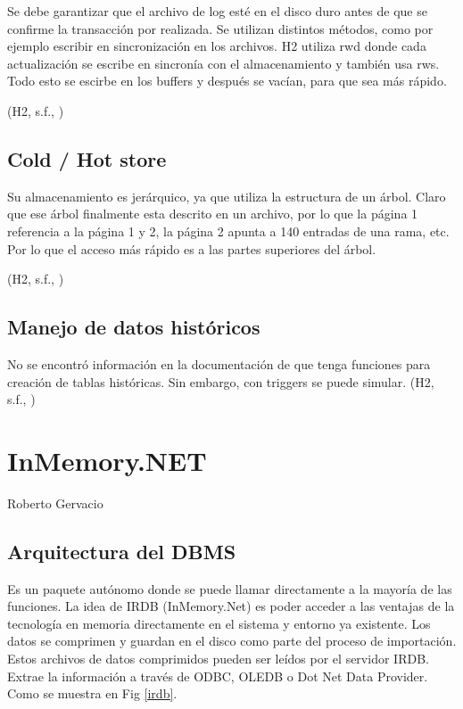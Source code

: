 \documentclass{acmart}
\begin{document}
Se debe garantizar que el archivo de log esté en el disco duro antes de que se confirme la transacción por realizada. Se utilizan distintos métodos, como por ejemplo escribir en sincronización en los archivos. H2 utiliza rwd donde cada actualización se escribe en sincronía con el almacenamiento y también usa rws. Todo esto se escirbe en los buffers y después se vacían, para que sea más rápido. 

(H2, s.f., \cite{h2advanced})

\subsection{Cold / Hot store}

Su almacenamiento es jerárquico, ya que utiliza la estructura de un árbol. Claro que ese árbol finalmente esta descrito en un archivo, por lo que la página 1 referencia a la página 1 y 2, la página 2 apunta a 140 entradas de una rama, etc. Por lo que el acceso más rápido es a las partes superiores del árbol. 

(H2, s.f., \cite{h2advanced})

\subsection{Manejo de datos históricos}

No se encontró información en la documentación de que tenga funciones para creación de tablas históricas.  Sin embargo, con triggers se puede simular. 
(H2, s.f., \cite{h2advanced})




\newpage

\section{InMemory.NET}
Roberto Gervacio
\subsection{Arquitectura del DBMS}

Es un paquete autónomo donde se puede llamar directamente a la mayoría de las funciones. La idea de IRDB (InMemory.Net) es poder acceder a las ventajas de la tecnología en memoria directamente en el sistema y entorno ya existente. Los datos se comprimen y guardan en el disco como parte del proceso de importación. Estos archivos de datos comprimidos pueden ser leídos por el servidor IRDB. Extrae la información a través de ODBC, OLEDB o Dot Net Data Provider. Como se muestra en Fig \ref{irdb}.
\end{document}
